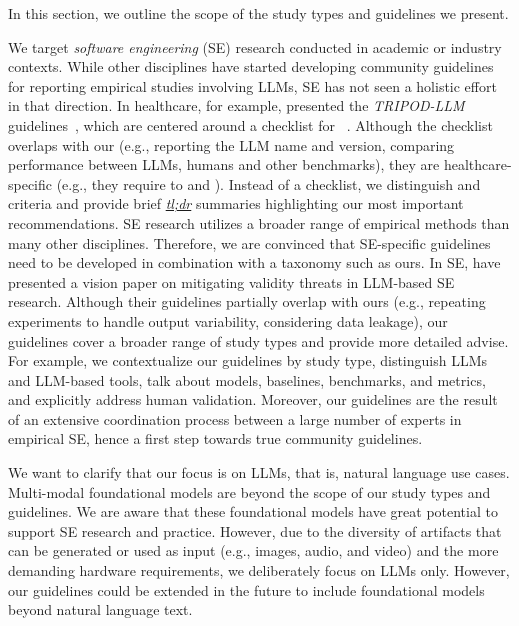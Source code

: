 In this section, we outline the scope of the study types and guidelines we present.


We target \emph{software engineering} (SE) research conducted in academic or industry contexts.
While other disciplines have started developing community guidelines for reporting empirical studies involving LLMs, SE has not seen a holistic effort in that direction.
In healthcare, for example, \citeauthor{Gallifant2025} presented the \emph{TRIPOD-LLM} guidelines~\cite{Gallifant2025}, which are centered around a checklist for ~\cite{Gallifant2025}.
Although the checklist overlaps with our \guidelines (e.g., reporting the LLM name and version, comparing performance between LLMs, humans and other benchmarks), they are healthcare-specific (e.g., they require to  and ).
Instead of a checklist, we distinguish \must and \should criteria and provide brief \underline{\emph{tl;dr}} summaries highlighting our most important recommendations.
SE research utilizes a broader range of empirical methods than many other disciplines.
Therefore, we are convinced that SE-specific guidelines need to be developed in combination with a \studytypes taxonomy such as ours.
In SE, \citeauthor{sallou2024breaking} have presented a vision paper on mitigating validity threats in LLM-based SE research.
Although their guidelines partially overlap with ours (e.g., repeating experiments to handle output variability, considering data leakage), our guidelines cover a broader range of study types and provide more detailed advise.
For example, we contextualize our guidelines by study type, distinguish LLMs and LLM-based tools, talk about models, baselines, benchmarks, and metrics, and explicitly address human validation.
Moreover, our guidelines are the result of an extensive coordination process between a large number of experts in empirical SE, hence a first step towards true community guidelines.




We want to clarify that our focus is on LLMs, that is, natural language use cases.
Multi-modal foundational models are beyond the scope of our study types and guidelines.
We are aware that these foundational models have great potential to support SE research and practice.
However, due to the diversity of artifacts that can be generated or used as input (e.g., images, audio, and video) and the more demanding hardware requirements, we deliberately focus on LLMs only.
However, our guidelines could be extended in the future to include foundational models beyond natural language text.

